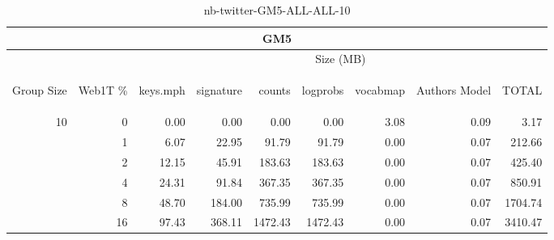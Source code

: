 \begin{center}
\begin{table}[htbp] 
 \begin{center}
\begin{tabular}{ | r | r | r | r | r | r | r | r | r |}
\hline
\multicolumn{9}{|c|}{GM5}\\
\hline
 & & \multicolumn{7}{|c|}{Size (MB)}\\ \cline{3-9}
\begin{sideways}Group Size\end{sideways} & \begin{sideways}Web1T \% \end{sideways} & \begin{sideways}keys.mph\end{sideways} & \begin{sideways}signature\end{sideways} & \begin{sideways}counts\end{sideways} & \begin{sideways}logprobs\end{sideways} & \begin{sideways}vocabmap\end{sideways} & \begin{sideways}Authors Model \end{sideways} & \begin{sideways}TOTAL\end{sideways}\\
\hline
\multirow{5}{*}{10}
 & 0 & 0.00 & 0.00 & 0.00 & 0.00 & 3.08 & 0.09 & 3.17\\ \cline{2-9}
 & 1 & 6.07 & 22.95 & 91.79 & 91.79 & 0.00 & 0.07 & 212.66\\ \cline{2-9}
 & 2 & 12.15 & 45.91 & 183.63 & 183.63 & 0.00 & 0.07 & 425.40\\ \cline{2-9}
 & 4 & 24.31 & 91.84 & 367.35 & 367.35 & 0.00 & 0.07 & 850.91\\ \cline{2-9}
 & 8 & 48.70 & 184.00 & 735.99 & 735.99 & 0.00 & 0.07 & 1704.74\\ \cline{2-9}
 & 16 & 97.43 & 368.11 & 1472.43 & 1472.43 & 0.00 & 0.07 & 3410.47\\ \cline{2-9}
\hline
\end{tabular}
\caption{nb-twitter-GM5-ALL-ALL-10}
\label{table:nb-twitter-GM5-ALL-ALL-10}
\end{center}
 \end{table}
\end{center}

